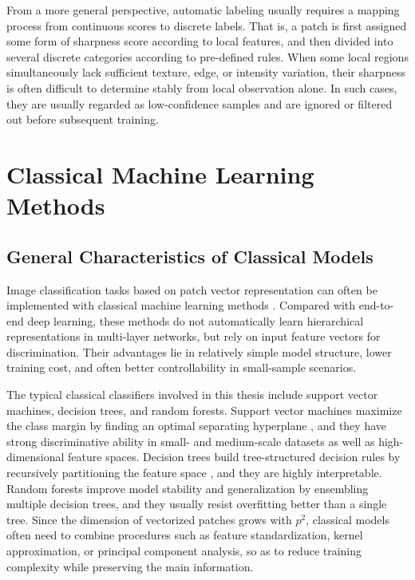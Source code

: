 \par From a more general perspective, automatic labeling usually requires a
mapping process from continuous scores to discrete labels. That is, a patch is
first assigned some form of sharpness score according to local features, and
then divided into several discrete categories according to pre-defined rules.
When some local regions simultaneously lack sufficient texture, edge, or
intensity variation, their sharpness is often difficult to determine stably
from local observation alone. In such cases, they are usually regarded as
low-confidence samples and are ignored or filtered out before subsequent
training.

\section{Classical Machine Learning Methods}
\subsection{General Characteristics of Classical Models}
\par Image classification tasks based on patch vector representation can often be
implemented with classical machine learning methods \cite{murphy2022pml}.
Compared with end-to-end deep learning, these methods do not automatically
learn hierarchical representations in multi-layer networks, but rely on input
feature vectors for discrimination. Their advantages lie in relatively simple
model structure, lower training cost, and often better controllability in
small-sample scenarios.

\par The typical classical classifiers involved in this thesis include support
vector machines, decision trees, and random forests. Support vector machines
maximize the class margin by finding an optimal separating hyperplane
\cite{cortes1995support}, and they have strong discriminative ability in
small- and medium-scale datasets as well as high-dimensional feature spaces.
Decision trees build tree-structured decision rules by recursively partitioning
the feature space \cite{breiman2017classification}, and they are highly
interpretable. Random forests improve model stability and generalization by
ensembling multiple decision trees, and they usually resist overfitting better
than a single tree. Since the dimension of vectorized patches grows with
$p^2$, classical models often need to combine procedures such as feature
standardization, kernel approximation, or principal component analysis, so as
to reduce training complexity while preserving the main information.

